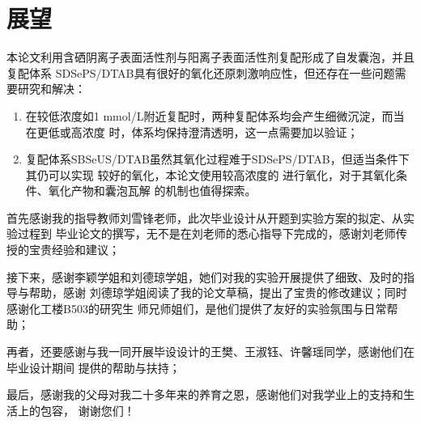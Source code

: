 \documentclass[bachelor,winfonts,replaceperiod]{jnuthesis}
\begin{document}
    \section{展望}
    本论文利用含硒阴离子表面活性剂与阳离子表面活性剂复配形成了自发囊泡，并且复配体系
    SDSePS/DTAB具有很好的氧化还原刺激响应性，但还存在一些问题需要研究和解决：
    \begin{enumerate}
        \item 在较低浓度如1 mmol/L附近复配时，两种复配体系均会产生细微沉淀，而当在更低或高浓度
        时，体系均保持澄清透明，这一点需要加以验证；
        \item 复配体系SBSeUS/DTAB虽然其氧化过程难于SDSePS/DTAB，但适当条件下其仍可以实现
        较好的氧化，本论文使用较高浓度的  进行氧化，对于其氧化条件、氧化产物和囊泡瓦解
        的机制也值得探索。
    \end{enumerate}
    
    \begin{backmatter}
    
    \end{backmatter}

    \begin{acknowledgement}
        首先感谢我的指导教师刘雪锋老师，此次毕业设计从开题到实验方案的拟定、从实验过程到
        毕业论文的撰写，无不是在刘老师的悉心指导下完成的，感谢刘老师传授的宝贵经验和建议；
        
        接下来，感谢李颖学姐和刘德琼学姐，她们对我的实验开展提供了细致、及时的指导与帮助，感谢
        刘德琼学姐阅读了我的论文草稿，提出了宝贵的修改建议；同时感谢化工楼B503的研究生
        师兄师姐们，是他们提供了友好的实验氛围与日常帮助；
        
        再者，还要感谢与我一同开展毕设设计的王樊、王淑钰、许馨瑶同学，感谢他们在毕业设计期间
        提供的帮助与扶持；
        
        最后，感谢我的父母对我二十多年来的养育之恩，感谢他们对我学业上的支持和生活上的包容，
        谢谢您们！
    \end{acknowledgement}
    
\end{document}
